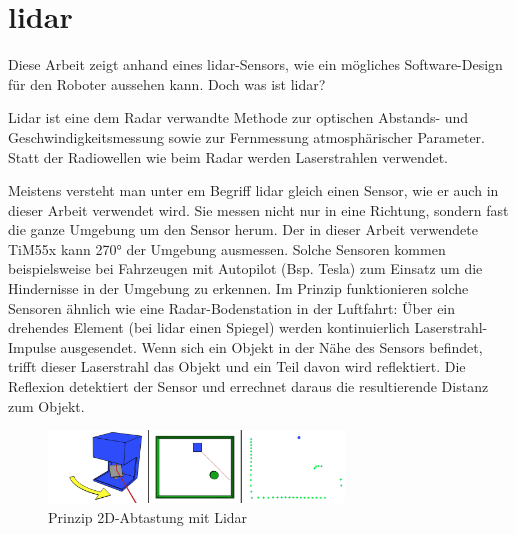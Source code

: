 \section{\acrshort{lidar}}
Diese Arbeit zeigt anhand eines \acrshort{lidar}-Sensors, wie ein mögliches Software-Design für den Roboter aussehen kann. Doch was ist \acrshort{lidar}?
\begin{formal}
	Lidar ist eine dem Radar verwandte Methode zur optischen Abstands- und Geschwindigkeitsmessung sowie zur Fernmessung atmosphärischer Parameter. Statt der Radiowellen wie beim Radar werden Laserstrahlen verwendet. \cite{wikipedia-lidar}
\end{formal}
Meistens versteht man unter em Begriff \acrshort{lidar} gleich einen Sensor, wie er auch in dieser Arbeit verwendet wird. Sie messen nicht nur in eine Richtung, sondern fast die ganze Umgebung um den Sensor herum. Der in dieser Arbeit verwendete TiM55x kann 270° der Umgebung ausmessen. Solche Sensoren kommen beispielsweise bei Fahrzeugen mit Autopilot (Bsp. Tesla) zum Einsatz um die Hindernisse in der Umgebung zu erkennen. Im Prinzip funktionieren solche Sensoren ähnlich wie eine Radar-Bodenstation in der Luftfahrt: Über ein drehendes Element (bei \acrshort{lidar} einen Spiegel) werden kontinuierlich Laserstrahl-Impulse ausgesendet. Wenn sich ein Objekt in der Nähe des Sensors befindet, trifft dieser Laserstrahl das Objekt und ein Teil davon wird reflektiert. Die Reflexion detektiert der Sensor und errechnet daraus die resultierende Distanz zum Objekt.
\begin{figure}[H]
	\centering
	\includegraphics[width=0.7\textwidth]{img/lidar-principle.png}
	\caption{Prinzip 2D-Abtastung mit Lidar \cite{wikipedia-lidar}}
	\label{fig:lidar-principle}
\end{figure}


